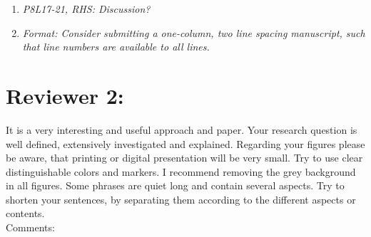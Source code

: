 \documentclass{article}
\begin{document}
\begin{enumerate}
  
  \item \textit{P8L17-21, RHS: Discussion?}
  
  
  \item \textit{Format: Consider submitting a one-column, two line spacing manuscript, such that line numbers are available to all lines.}
  
   
\end{enumerate} 
  

\section*{Reviewer 2:}

It is a very interesting and useful approach and paper. Your research question is well defined, extensively investigated and explained. Regarding your figures please be aware, that printing or digital presentation will be very small. Try to use clear distinguishable colors and markers. I recommend removing the grey background in all figures. Some phrases are quiet long and contain several aspects. Try to shorten your sentences, by separating them according to the different aspects or contents.\\

Comments:\\
\end{document}
